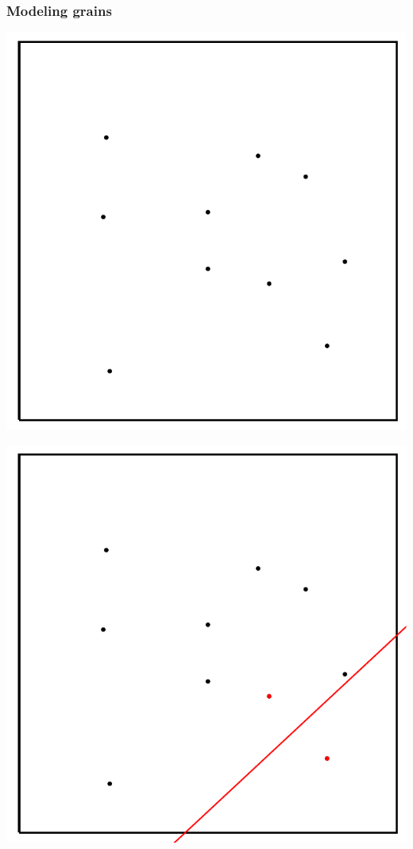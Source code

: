 \begin{frame}[fragile]
  \frametitle{Modeling grains}

\begin{overprint}

\begin{center}
\includegraphics[height=0.9\textheight]{fig/voronoi-x}
\par\end{center}

\begin{center}
\includegraphics[height=0.9\textheight]{fig/voronoi-b1}
\par\end{center}


\end{overprint}
\end{frame}
